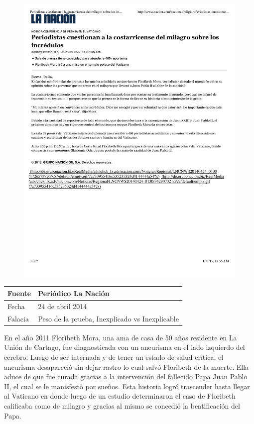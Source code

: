 \documentclass[times]{simauth}
\begin{document}
\begin{figure}[h]
    \centering
    \includegraphics[width=15cm]{floribeth-mora-milagro}
    \label{fig:falacia2}
\end{figure}

\newpage

\begin{table}[h!]
    \begin{tabular}{ll} 
        \toprule[1.5pt]
        Fuente & Periódico La Nación\\
        \midrule[0.5pt]
        Fecha  & 24 de abril 2014\\
        \midrule[0.5pt]
        Falacia & Peso de la prueba, Inexplicado vs Inexplicable \\
        \bottomrule[1.5pt]
    \end{tabular} 
\end{table}


En el año 2011 Floribeth Mora, una ama de casa de 50 años residente en La Unión de Cartago, fue diagnosticada con un aneurisma en el lado izquierdo del cerebro. Luego de ser internada y de tener un estado de salud crítica, el aneurisma desapareció sin dejar rastro lo cual salvó Floribeth de la muerte. Ella aduce de que fue curada gracias a la intervención del fallecido Papa Juan Pablo II, el cual se le manisfestó por sueños. Esta historia logró trascender hasta llegar al Vaticano en donde luego de un estudio determinaron el caso de Floribeth calificaba como de milagro y gracias al mismo se concedió la beatificación del Papa.
\end{document}
